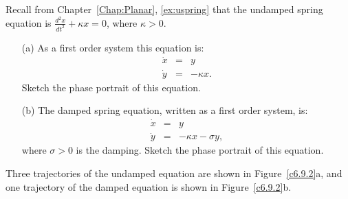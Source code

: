 \documentclass{ximera}
\begin{document}
\begin{exercise} \label{c6.9.2}
Recall from Chapter~\ref{Chap:Planar}, \eqref{ex:uspring} that the undamped
spring equation is $\frac{d^2x}{dt^2} + \kappa x = 0$, where $\kappa>0$.
\begin{itemize}
\item[(a)]   As a first order system this equation is:
\begin{eqnarray*}
\dot{x} & = & y \\
\dot{y} & = & -\kappa x.
\end{eqnarray*}
Sketch the phase portrait of this equation.
\item[(b)]  The damped spring equation, written as a first order system, is:
\begin{eqnarray*}
\dot{x} & = & y \\
\dot{y} & = & -\kappa x-\sigma y,
\end{eqnarray*}
where $\sigma>0$ is the damping.  Sketch the phase portrait of this equation.
\end{itemize}

\begin{solution}

Three trajectories of the undamped equation are shown in Figure~\ref{c6.9.2}a,
and one trajectory of the damped equation is shown in Figure~\ref{c6.9.2}b.





\end{solution}
\end{exercise}
\end{document}
